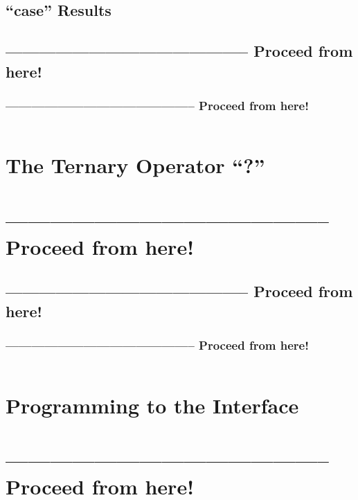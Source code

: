\documentclass[11pt,a4paper, titlepage, parskip=half, headsepline, footsepline, cleardoublepage=current, headheight=1cm]{scrbook}
\begin{document}
\subsection{“case” Results}\label{sec:CaseResults}
\subsection{-------------------------------------------- Proceed from here!}
\subsubsection{-------------------------------------------- Proceed from here!}
\autocite{ORACLE_DOC_SWITCHEXPRESSIONS}
\autocite{}
\autocite{}
\autocite{}
\autocite{}
\autocite{}
\autocite{}
\autocite{}
\autocite{}
\lipsum[5]

\begin{lstlisting}
\end{lstlisting}

\section{The Ternary Operator “?”}\label{sec:TheTernaryOperator}
\section{-------------------------------------------- Proceed from here!}
\subsection{-------------------------------------------- Proceed from here!}
\subsubsection{-------------------------------------------- Proceed from here!}
\lipsum[5]

\begin{lstlisting}
\end{lstlisting}

\section{Programming to the Interface}\label{sec:ProgrammingToTheInterface}
\section{-------------------------------------------- Proceed from here!}
\end{document}
